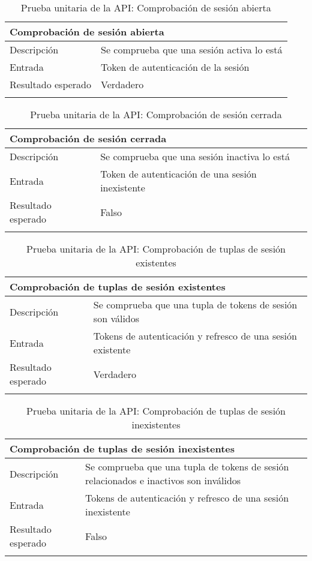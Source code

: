 \begin{longtable}{|p{} p{}|}
    \hline
    \multicolumn{2}{|l|}{\textbf{Comprobación de sesión abierta}} \\ \hline 
    Descripción                 & Se comprueba que una sesión activa lo está \\ \hline
    Entrada                     & Token de autenticación de la sesión \\ \hline
    Resultado esperado          & Verdadero \\ \hline
    \caption{Prueba unitaria de la API: Comprobación de sesión abierta}
    \label{cp:u:api:comprobar_sesion_abierta}
\end{longtable}

\begin{longtable}{|p{} p{}|}
    \hline
    \multicolumn{2}{|l|}{\textbf{Comprobación de sesión cerrada}} \\ \hline 
    Descripción                 & Se comprueba que una sesión inactiva lo está \\ \hline
    Entrada                     & Token de autenticación de una sesión inexistente \\ \hline
    Resultado esperado          & Falso \\ \hline
    \caption{Prueba unitaria de la API: Comprobación de sesión cerrada}
    \label{cp:u:api:comprobar_sesion_cerrada}
\end{longtable}

\begin{longtable}{|p{} p{}|}
    \hline
    \multicolumn{2}{|l|}{\textbf{Comprobación de tuplas de sesión existentes}} \\ \hline 
    Descripción                 & Se comprueba que una tupla de tokens de sesión son válidos \\ \hline
    Entrada                     & Tokens de autenticación y refresco de una sesión existente \\ \hline
    Resultado esperado          & Verdadero \\ \hline
    \caption{Prueba unitaria de la API: Comprobación de tuplas de sesión existentes}
    \label{cp:u:api:comprobar_tupla_existente}
\end{longtable}

\newpage
\begin{longtable}{|p{} p{}|}
    \hline
    \multicolumn{2}{|l|}{\textbf{Comprobación de tuplas de sesión inexistentes}} \\ \hline 
    Descripción                 & Se comprueba que una tupla de tokens de sesión relacionados e inactivos son inválidos \\ \hline
    Entrada                     & Tokens de autenticación y refresco de una sesión inexistente \\ \hline
    Resultado esperado          & Falso \\ \hline
    \caption{Prueba unitaria de la API: Comprobación de tuplas de sesión inexistentes}
    \label{cp:u:api:comprobar_tupla_inexistente}
\end{longtable}

